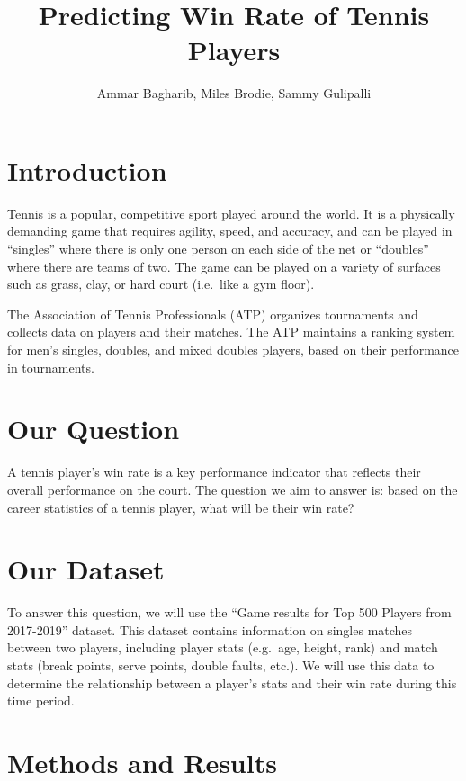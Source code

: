 \documentclass[
]{article}
\title{Predicting Win Rate of Tennis Players}
\author{Ammar Bagharib, Miles Brodie, Sammy Gulipalli}
\date{}
\begin{document}
\maketitle

{
\setcounter{tocdepth}{2}
\tableofcontents
}
\hypertarget{introduction}{%
\section{Introduction}\label{introduction}}

Tennis is a popular, competitive sport played around the world. It is a physically demanding game that requires agility, speed, and accuracy, and can be played in ``singles'' where there is only one person on each side of the net or ``doubles'' where there are teams of two. The game can be played on a variety of surfaces such as grass, clay, or hard court (i.e.~like a gym floor).

The Association of Tennis Professionals (ATP) organizes tournaments and collects data on players and their matches. The ATP maintains a ranking system for men's singles, doubles, and mixed doubles players, based on their performance in tournaments.

\hypertarget{our-question}{%
\section{Our Question}\label{our-question}}

A tennis player's win rate is a key performance indicator that reflects their overall performance on the court. The question we aim to answer is: based on the career statistics of a tennis player, what will be their win rate?

\hypertarget{our-dataset}{%
\section{Our Dataset}\label{our-dataset}}

To answer this question, we will use the ``Game results for Top 500 Players from 2017-2019'' dataset. This dataset contains information on singles matches between two players, including player stats (e.g.~age, height, rank) and match stats (break points, serve points, double faults, etc.). We will use this data to determine the relationship between a player's stats and their win rate during this time period.

\hypertarget{methods-and-results}{%
\section{Methods and Results}\label{methods-and-results}}
\end{document}
